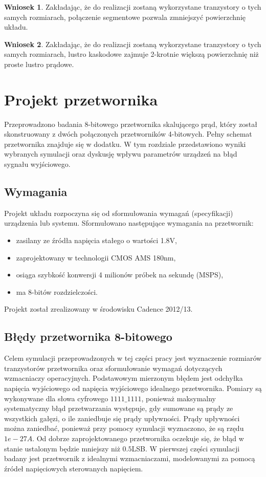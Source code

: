 \documentclass[10pt,a4paper,twoside]{report}
\theoremstyle{definition}
\theoremstyle{definition}
\theoremstyle{definition}
\theoremstyle{definition}
\theoremstyle{definition}
\newtheorem{wniosek}{Wniosek}[section]
\begin{document}
{{	\begin{wniosek}{Zakładając, że do realizacji zostaną wykorzystane tranzystory o tych samych rozmiarach, połączenie segmentowe pozwala zmniejszyć powierzchnię układu.}
	\end{wniosek}

	\begin{wniosek}{Zakładając, że do realizacji zostaną wykorzystane tranzystory o tych samych rozmiarach, lustro kaskodowe zajmuje 2-krotnie większą powierzchnię niż proste lustro prądowe.}
	\end{wniosek}

	\chapter{Projekt przetwornika}
	{	Przeprowadzono badania 8-bitowego przetwornika skalującego prąd, który został skonstruowany z dwóch połączonych przetworników 4-bitowych. Pełny schemat przetwornika znajduje się w dodatku. W tym rozdziale przedstawiono wyniki wybranych symulacji oraz dyskusję wpływu parametrów urządzeń na błąd sygnału wyjściowego.}
	
	\section{Wymagania}
	{	Projekt układu rozpoczyna się od sformułowania wymagań (specyfikacji) urządzenia lub systemu. Sformułowano następujące wymagania na przetwornik:
		\begin{itemize}
			\item zasilany ze źródła napięcia stałego o wartości 1.8V,
			\item zaprojektowany w technologii CMOS AMS 180nm,
			\item osiąga szybkość konwersji 4 milionów próbek na sekundę (MSPS),
			\item ma 8-bitów rozdzielczości.
		\end{itemize} 
	Projekt został zrealizowany w środowisku Cadence 2012/13.}
	
	\section{Błędy przetwornika 8-bitowego}
	{ Celem symulacji przeprowadzonych w tej części pracy jest wyznaczenie rozmiarów tranzystorów przetwornika oraz sformułowanie wymagań dotyczących wzmacniaczy operacyjnych. Podstawowym mierzonym błędem jest odchyłka napięcia wyjściowego od napięcia wyjściowego idealnego przetwornika. Pomiary są wykonywane dla słowa cyfrowego $1111\_1111$, ponieważ maksymalny systematyczny błąd przetwarzania występuje, gdy sumowane są prądy ze wszystkich gałęzi, o ile zaniedbuje się prądy upływności. Prądy upływności można zaniedbać, ponieważ przy pomocy symulacji wyznaczono, że są rzędu $1e-27A$. Od dobrze zaprojektowanego przetwornika oczekuje się, że błąd w stanie ustalonym będzie mniejszy niż $0.5$LSB. W pierwszej części symulacji badany jest przetwornik z idealnymi wzmacniaczami, modelowanymi za pomocą źródeł napięciowych sterowanych napięciem.}
	
}}
\end{document}
